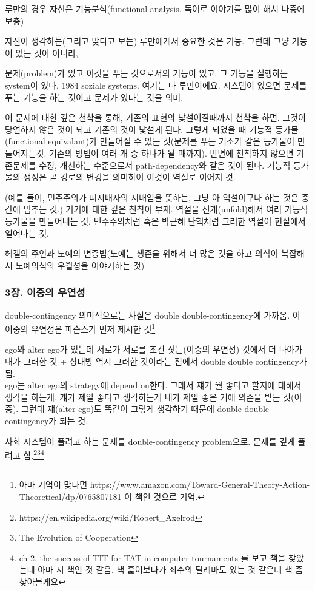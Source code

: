 \documentclass[12pt, a4paper]{article}
\begin{document}
루만의 경우 자신은 기능분석(functional analysis. 독어로 이야기를 많이 해서 나중에 보충)

자신이 생각하는(그리고 맞다고 보는) 루만에게서 중요한 것은 기능. 그런데 그냥 기능이 있는 것이 아니라,

문제(problem)가 있고 이것을 푸는 것으로서의 기능이 있고, 그 기능을 실행하는 system이 있다. 1984 soziale systems. 여기는 다 루만이에요. 시스템이 있으면 문제를 푸는 기능을 하는 것이고 문제가 있다는 것을 의미. 

이 문제에 대한 깊은 천착을 통해, 기존의 표현의 낯설어질때까지 천착을 하면. 그것이 당연하지 않은 것이 되고 기존의 것이 낯설게 된다. 그렇게 되었을 때 기능적 등가물(functional equivalant)가 만들어질 수 있는 것(문제를 푸는 거소가 같은 등가물이 만들어지는것. 기존의 방법이 여러 개 중 하나가 될 때까지). 반면에 천착하지 않으면 기존문제를 수정, 개선하는 수준으로서 path-dependency와 같은 것이 된다. 기능적 등가물의 생성은 곧 경로의 변경을 의미하여 이것이 역설로 이어지 것.

(예를 들어, 민주주의가 피지배자의 지배임을 뜻하는, 그냥 아 역설이구나 하는 것은 중간에 멈추는 것.) 거기에 대한 깊은 천착이 부재. 역설을 전개(unfold)해서 여러 기능적 등가물을 만들어내는 것. 민주주의처럼 혹은 박근혜 탄핵처럼 그러한 역설이 현실에서 일어나는 것. 

헤겔의 주인과 노예의 변증법(노예는 생존을 위해서 더 많은 것을 하고 의식이 복잡해서 노예의식의 우월성을 이야기하는 것)

\subsubsection{3장. 이중의 우연성}
double-contingency
의미적으로는 사실은 double double-contingency에 가까움. 이 이중의 우연성은 파슨스가 먼저 제시한 것\footnote{아마 기억이 맞다면 https://www.amazon.com/Toward-General-Theory-Action-Theoretical/dp/0765807181 이 책인 것으로 기억.}

ego와 alter ego가 있는데 서로가 서로를 조건 짓는(이중의 우연성) 것에서 더 나아가 내가 그러한 것 + 상대방 역시 그러한 것이라는 점에서 double double contingency가 됨. \\

ego는 alter ego의 strategy에 depend on한다. 그래서 쟤가 뭘 좋다고 할지에 대해서 생각을 하는게. 걔가 제일 좋다고 생각하는게 내가 제일 좋은 거에 의존을 받는 것(이중). 그런데 쟤(alter ego)도 똑같이 그렇게 생각하기 때문에 double double contingency가 되는 것.

사회 시스템이 풀려고 하는 문제를 double-contingency problem으로. 문제를 깊게 풀려고 함.\footnote{https://en.wikipedia.org/wiki/Robert_Axelrod}\footnote{The Evolution of Cooperation}\footnote{ch 2. the success of TIT for TAT in computer tournaments 를 보고 책을 찾았는데 아마 저 책인 것 같음. 책 훑어보다가 죄수의 딜레마도 있는 것 같은데 책 좀 찾아볼게요}
\end{document}
